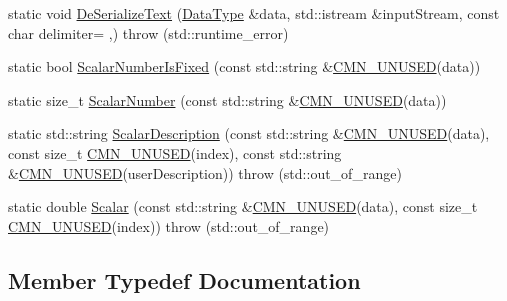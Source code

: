 \begin{DoxyCompactItemize}
\item 
static void \hyperlink{classcmn_data_3_01std_1_1string_01_4_a3b5d60a66380dc699478f034a97bf80d}{De\+Serialize\+Text} (\hyperlink{classcmn_data_3_01std_1_1string_01_4_a04ffa92a93dc010ed2bf5bf19e2d0fdd}{Data\+Type} \&data, std\+::istream \&input\+Stream, const char delimiter= \textquotesingle{},\textquotesingle{})  throw (std\+::runtime\+\_\+error)
\item 
static bool \hyperlink{classcmn_data_3_01std_1_1string_01_4_a4439940c9caf6fa0c5aed5d7f1f67220}{Scalar\+Number\+Is\+Fixed} (const std\+::string \&\hyperlink{cmn_portability_8h_a021894e2626935fa2305434b1e893ff6}{C\+M\+N\+\_\+\+U\+N\+U\+S\+E\+D}(data))
\item 
static size\+\_\+t \hyperlink{classcmn_data_3_01std_1_1string_01_4_ac957913077f40ae21b4be6818adc177c}{Scalar\+Number} (const std\+::string \&\hyperlink{cmn_portability_8h_a021894e2626935fa2305434b1e893ff6}{C\+M\+N\+\_\+\+U\+N\+U\+S\+E\+D}(data))
\item 
static std\+::string \hyperlink{classcmn_data_3_01std_1_1string_01_4_a7c9969a22e74ef45544cd585df2a5dc3}{Scalar\+Description} (const std\+::string \&\hyperlink{cmn_portability_8h_a021894e2626935fa2305434b1e893ff6}{C\+M\+N\+\_\+\+U\+N\+U\+S\+E\+D}(data), const size\+\_\+t \hyperlink{cmn_portability_8h_a021894e2626935fa2305434b1e893ff6}{C\+M\+N\+\_\+\+U\+N\+U\+S\+E\+D}(index), const std\+::string \&\hyperlink{cmn_portability_8h_a021894e2626935fa2305434b1e893ff6}{C\+M\+N\+\_\+\+U\+N\+U\+S\+E\+D}(user\+Description))  throw (std\+::out\+\_\+of\+\_\+range)
\item 
static double \hyperlink{classcmn_data_3_01std_1_1string_01_4_ae03333be4482856cd9b51094c6611b28}{Scalar} (const std\+::string \&\hyperlink{cmn_portability_8h_a021894e2626935fa2305434b1e893ff6}{C\+M\+N\+\_\+\+U\+N\+U\+S\+E\+D}(data), const size\+\_\+t \hyperlink{cmn_portability_8h_a021894e2626935fa2305434b1e893ff6}{C\+M\+N\+\_\+\+U\+N\+U\+S\+E\+D}(index))  throw (std\+::out\+\_\+of\+\_\+range)
\end{DoxyCompactItemize}


\subsection{Member Typedef Documentation}
\hypertarget{classcmn_data_3_01std_1_1string_01_4_a04ffa92a93dc010ed2bf5bf19e2d0fdd}{}
